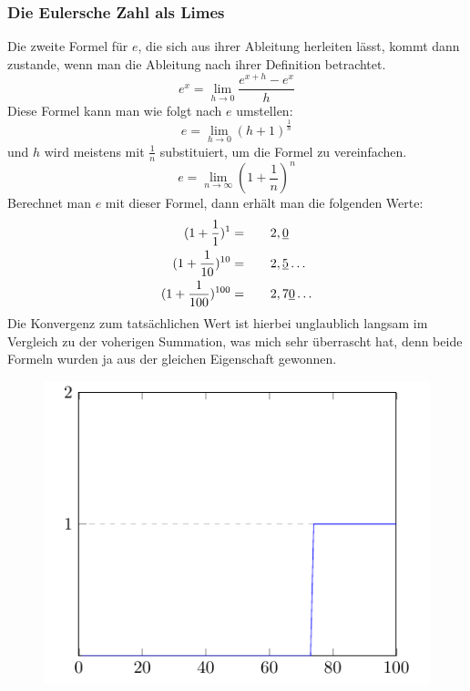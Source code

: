 \subsubsection{Die Eulersche Zahl als Limes}
Die zweite Formel für $e$, die sich aus ihrer Ableitung herleiten lässt, kommt dann zustande, wenn man die Ableitung nach ihrer Definition betrachtet. \[
e^x = \lim_{h\to0} \frac{e^{x+h}-e^x}{h}\]
Diese Formel kann man wie folgt nach $e$ umstellen:\[
e = \lim_{h\to0} (h + 1)^{\frac{1}{h}}\] 
und $h$ wird meistens mit $\frac{1}{n}$ substituiert, um die Formel zu vereinfachen.\[
e = \lim_{n\to\infty} (1+\frac{1}{n})^n\]
Berechnet man $e$ mit dieser Formel, dann erhält man die folgenden Werte: \[
  \begin{aligned}
  (1+\frac{1}{1})^1 = \indent\crel{2},\underline{0}\\
  (1+\frac{1}{10})^{10} =  \indent\crel{2},\underline{5}\dots\\
  (1+\frac{1}{100})^{100} = \indent\crel{2},7\underline{0}\dots
\end{aligned} \]
Die Konvergenz zum tatsächlichen Wert ist hierbei unglaublich langsam im Vergleich zu der voherigen Summation, was mich sehr überrascht hat, denn beide Formeln wurden ja aus der gleichen Eigenschaft gewonnen.
\begin{figure}[h]
  \includegraphics{medien2/limes/limes.pdf}
  \centering
\end{figure}
